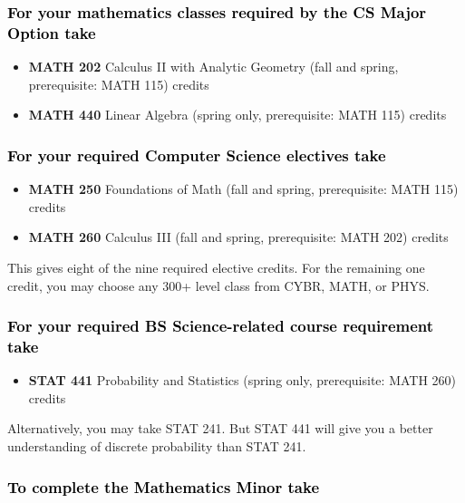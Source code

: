 \documentclass[9pt]{article}
\newenvironment{mypar}[2]
   {\begin{list}{}%
     {\setlength\leftmargin{#1}
     \setlength\rightmargin{#2}}
     \item[]}
   {\end{list}}
\begin{document}
\subsubsection*{\textcolor{black}{For your mathematics classes required by the CS Major Option take}}
\begin{itemize}
\item \textbf{MATH 202} Calculus II with Analytic Geometry (fall and spring,  prerequisite: MATH 115)  credits
\item  \textbf{MATH 440} Linear Algebra (spring only, prerequisite: MATH 115)  credits
\end{itemize}

\subsubsection*{\textcolor{black}{For your required Computer Science electives take}}

\begin{itemize}
\item \textbf{MATH 250} Foundations of Math (fall and spring, prerequisite: MATH 115)   credits
\item \textbf{MATH 260} Calculus III  (fall and spring, prerequisite: MATH 202)  credits
\end{itemize}
\vspace{-0.1in}
\begin{mypar}{0.5cm}{0.5cm} This gives eight of the nine required elective credits. For the remaining one credit, you may choose any 300+ level class from CYBR,  MATH, or PHYS.
\end{mypar}
\subsubsection*{\textcolor{black}{For your required BS Science-related course requirement take}}
\begin{itemize}
\item \textbf{STAT 441} Probability and Statistics (spring only, prerequisite: MATH 260)   credits
\end{itemize}
\vspace{-0.1in}
\begin{mypar}{0.5cm}{0.5cm}Alternatively, you may take STAT 241.  But STAT 441 will give you  a  better understanding of discrete probability than STAT 241.
\end{mypar}
\subsubsection*{\textcolor{black}{To complete the Mathematics Minor  take}}
\end{document}
